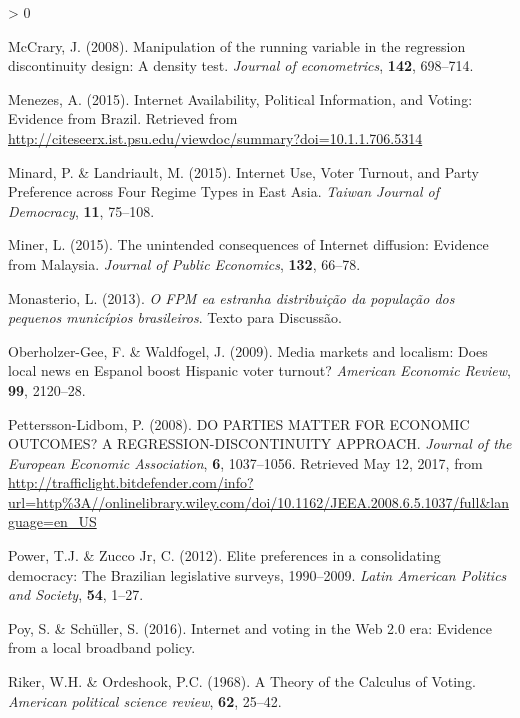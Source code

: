 \documentclass[
  12pt,
]{article}
\newlength{\cslhangindent}
\newenvironment{CSLReferences}[2] %
 {%
  \setlength{\parindent}{0pt}
  \ifodd #1 \everypar{\setlength{\hangindent}{\cslhangindent}}\ignorespaces\fi
  \ifnum #2 > 0
  \setlength{\parskip}{#2\baselineskip}
  \fi
 }%
 {}
\begin{document}
\begin{CSLReferences}{1}{0}
\leavevmode\hypertarget{ref-mccrary_manipulation_2008}{}%
McCrary, J. (2008). Manipulation of the running variable in the
regression discontinuity design: {A} density test. \emph{Journal of
econometrics}, \textbf{142}, 698--714.

\leavevmode\hypertarget{ref-menezes_internet_2015}{}%
Menezes, A. (2015). Internet {Availability}, {Political} {Information},
and {Voting}: {Evidence} from {Brazil}. Retrieved from
\url{http://citeseerx.ist.psu.edu/viewdoc/summary?doi=10.1.1.706.5314}

\leavevmode\hypertarget{ref-minard_internet_2015}{}%
Minard, P. \& Landriault, M. (2015). Internet {Use}, {Voter} {Turnout},
and {Party} {Preference} across {Four} {Regime} {Types} in {East}
{Asia}. \emph{Taiwan Journal of Democracy}, \textbf{11}, 75--108.

\leavevmode\hypertarget{ref-miner_unintended_2015}{}%
Miner, L. (2015). The unintended consequences of {Internet} diffusion:
{Evidence} from {Malaysia}. \emph{Journal of Public Economics},
\textbf{132}, 66--78.

\leavevmode\hypertarget{ref-monasterio_o_2013}{}%
Monasterio, L. (2013). \emph{O {FPM} ea estranha distribuição da
população dos pequenos municípios brasileiros}. Texto para Discussão.

\leavevmode\hypertarget{ref-oberholzer-gee_media_2009}{}%
Oberholzer-Gee, F. \& Waldfogel, J. (2009). Media markets and localism:
{Does} local news en {Espanol} boost {Hispanic} voter turnout?
\emph{American Economic Review}, \textbf{99}, 2120--28.

\leavevmode\hypertarget{ref-pettersson-lidbom_parties_2008}{}%
Pettersson-Lidbom, P. (2008). {DO} {PARTIES} {MATTER} {FOR} {ECONOMIC}
{OUTCOMES}? {A} {REGRESSION}-{DISCONTINUITY} {APPROACH}. \emph{Journal
of the European Economic Association}, \textbf{6}, 1037--1056. Retrieved
May 12, 2017, from
\url{http://trafficlight.bitdefender.com/info?url=http\%3A//onlinelibrary.wiley.com/doi/10.1162/JEEA.2008.6.5.1037/full\&language=en_US}

\leavevmode\hypertarget{ref-power_elite_2012}{}%
Power, T.J. \& Zucco Jr, C. (2012). Elite preferences in a consolidating
democracy: The {Brazilian} legislative surveys, 1990--2009. \emph{Latin
American Politics and Society}, \textbf{54}, 1--27.

\leavevmode\hypertarget{ref-poy_internet_2016}{}%
Poy, S. \& Schüller, S. (2016). Internet and voting in the {Web} 2.0
era: Evidence from a local broadband policy.

\leavevmode\hypertarget{ref-riker_theory_1968}{}%
Riker, W.H. \& Ordeshook, P.C. (1968). A {Theory} of the {Calculus} of
{Voting}. \emph{American political science review}, \textbf{62}, 25--42.


\end{CSLReferences}
\end{document}
